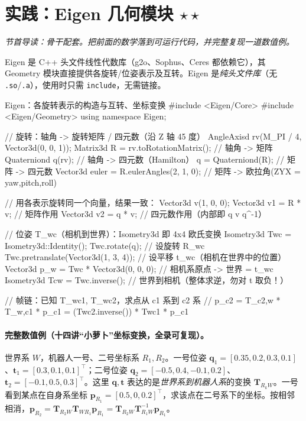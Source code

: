 \section{实践：Eigen 几何模块 \texorpdfstring{$\star\star$}{**}}
\label{sec:rb-eigen}
\noindent\emph{节首导读：骨干配套。把前面的数学落到可运行代码，并完整复现一道数值例。}

Eigen 是 C++ 头文件线性代数库（g2o、Sophus、Ceres 都依赖它），其 Geometry 模块直接提供各旋转/位姿表示及互转。Eigen 是\emph{纯头文件库}（无 \texttt{.so}/\texttt{.a}），使用时只需 \texttt{include}，无需链接\cite{gaoxiang2019slam14}。

\begin{codebox}[C++]{Eigen：各旋转表示的构造与互转、坐标变换}
#include <Eigen/Core>
#include <Eigen/Geometry>
using namespace Eigen;

// 旋转：轴角 -> 旋转矩阵 / 四元数（沿 Z 轴 45 度）
AngleAxisd rv(M_PI / 4, Vector3d(0, 0, 1));
Matrix3d   R = rv.toRotationMatrix();         // 轴角 -> 矩阵
Quaterniond q(rv);                            // 轴角 -> 四元数（Hamilton）
q = Quaterniond(R);                           // 矩阵 -> 四元数
Vector3d euler = R.eulerAngles(2, 1, 0);      // 矩阵 -> 欧拉角(ZYX = yaw,pitch,roll)

// 用各表示旋转同一个向量，结果一致：
Vector3d v(1, 0, 0);
Vector3d v1 = R * v;                           // 矩阵作用
Vector3d v2 = q * v;                           // 四元数作用（内部即 q v q^-1）

// 位姿 T_wc（相机到世界）：Isometry3d 即 4x4 欧氏变换
Isometry3d Twc = Isometry3d::Identity();
Twc.rotate(q);                                 // 设旋转 R_wc
Twc.pretranslate(Vector3d(1, 3, 4));           // 设平移 t_wc（相机在世界中的位置）
Vector3d p_w = Twc * Vector3d(0, 0, 0);        // 相机系原点 -> 世界 = t_wc
Isometry3d Tcw = Twc.inverse();                // 世界到相机（整体求逆，勿对 t 取负！）

// 帧链：已知 T_wc1, T_wc2，求点从 c1 系到 c2 系
// p_c2 = T_c2,w * T_w,c1 * p_c1 = (Twc2.inverse()) * Twc1 * p_c1
\end{codebox}

\paragraph{完整数值例（十四讲“小萝卜”坐标变换，全录可复现）。}世界系 $W$，机器人一号、二号坐标系 $R_1,R_2$。一号位姿 $\mathbf{q}_1=[0.35,0.2,0.3,0.1]$、$\mathbf{t}_1=[0.3,0.1,0.1]^\top$；二号位姿 $\mathbf{q}_2=[-0.5,0.4,-0.1,0.2]$、$\mathbf{t}_2=[-0.1,0.5,0.3]^\top$。这里 $\mathbf{q},\mathbf{t}$ 表达的是\emph{世界系到机器人系}的变换 $\mathbf{T}_{R_kW}$。一号看到某点在自身系坐标 $\mathbf{p}_{R_1}=[0.5,0,0.2]^\top$，求该点在二号系下的坐标。按相邻相消，$\mathbf{p}_{R_2}=\mathbf{T}_{R_2W}\mathbf{T}_{WR_1}\mathbf{p}_{R_1}=\mathbf{T}_{R_2W}\mathbf{T}_{R_1W}^{-1}\mathbf{p}_{R_1}$。

